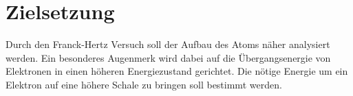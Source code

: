 \section{Zielsetzung}
\label{sec:Zielsetzung}

Durch den Franck-Hertz Versuch soll der Aufbau des Atoms näher analysiert werden.
Ein besonderes Augenmerk wird dabei auf die Übergangsenergie von Elektronen in einen höheren Energiezustand gerichtet.
Die nötige Energie um ein Elektron auf eine höhere Schale zu bringen soll bestimmt werden.